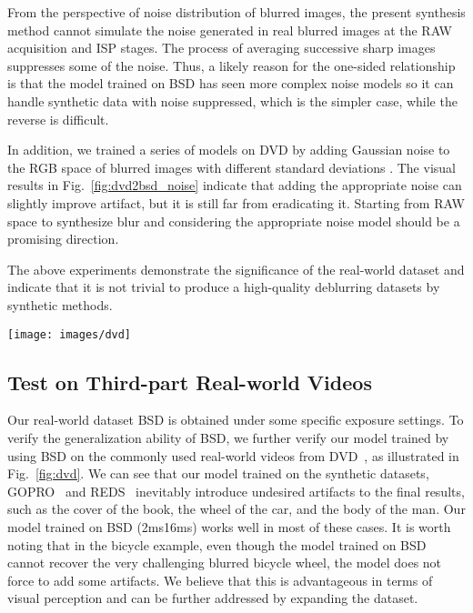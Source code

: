 \documentclass[twocolumn]{svjour3}          \smartqed  \usepackage{graphicx}
\begin{document}
From the perspective of noise distribution of blurred images, the present synthesis method cannot simulate the noise generated in real blurred images at the RAW acquisition and ISP stages. The process of averaging successive sharp images suppresses some of the noise. Thus, a likely reason for the one-sided relationship is that the model trained on BSD has seen more complex noise models so it can handle synthetic data with noise suppressed, which is the simpler case, while the reverse is difficult.

In addition, we trained a series of models on DVD by adding Gaussian noise to the RGB space of blurred images with different standard deviations . The visual results in Fig.~\ref{fig:dvd2bsd_noise} indicate that adding the appropriate noise can slightly improve artifact, but it is still far from eradicating it. Starting from RAW space to synthesize blur and considering the appropriate noise model should be a promising direction.

The above experiments demonstrate the significance of the real-world dataset and indicate that it is not trivial to produce a high-quality deblurring datasets by synthetic methods.

\begin{figure*}[ht]
	\centering
    \texttt{[image: images/dvd]}
	\caption{Qualitative results on real-world videos from~\cite{cho2012video,su2017deep}}
	\label{fig:dvd}
\end{figure*}

\subsection{Test on Third-part Real-world Videos}
Our real-world dataset BSD is obtained under some specific exposure settings. To verify the generalization ability of BSD, we further verify our model trained by using BSD on the commonly used real-world videos from DVD~\cite{cho2012video,su2017deep}, as illustrated in Fig.~\ref{fig:dvd}. We can see that our model trained on the synthetic datasets, GOPRO~\cite{nah2017deep} and REDS~\cite{nah2019ntire} inevitably introduce undesired artifacts to the final results, such as the cover of the book, the wheel of the car, and the body of the man. Our model trained on BSD (2ms16ms) works well in most of these cases. It is worth noting that in the bicycle example, even though the model trained on BSD cannot recover the very challenging blurred bicycle wheel, the model does not force to add some artifacts. We believe that this is advantageous in terms of visual perception and can be further addressed by expanding the dataset.
\end{document}
